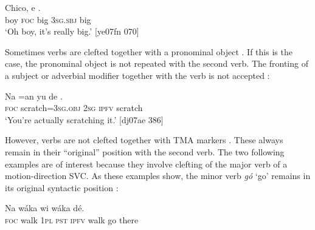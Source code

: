 \ea%
    \label{ex:key:733}
    \gll Chico,       e    .\\
boy    \textsc{foc}  big    \textsc{3sg.sbj}  big\\

\glt ‘Oh boy, it’s really big.’ [ye07fn 070]
\z


\z

Sometimes verbs are clefted together with a pronominal object . If this is the case, the pronominal object is not repeated with the second verb. The fronting of a subject or adverbial modifier together with the verb is not accepted :


\ea%
    \label{ex:key:735}
    \gll Na  =an    yu  de  .\\
\textsc{foc}  scratch=\textsc{3sg.obj}  \textsc{2sg}  \textsc{ipfv}  scratch \\

\glt ‘You’re actually scratching it.’ [dj07ae 386]
\z


\z

However, verbs are not clefted together with TMA markers . These always remain in their “original” position with the second verb. The two following examples are of interest because they involve clefting of the major verb of a motion-direction SVC. As these examples show, the minor verb \textit{gó} ‘go’ remains in its original syntactic position : 


\ea%
    \label{ex:key:737}
    \gll Na  wáka  wi     wáka    dé.\\
\textsc{foc}  walk  \textsc{1pl}  \textsc{pst}  \textsc{ipfv}  walk  go  there\\

